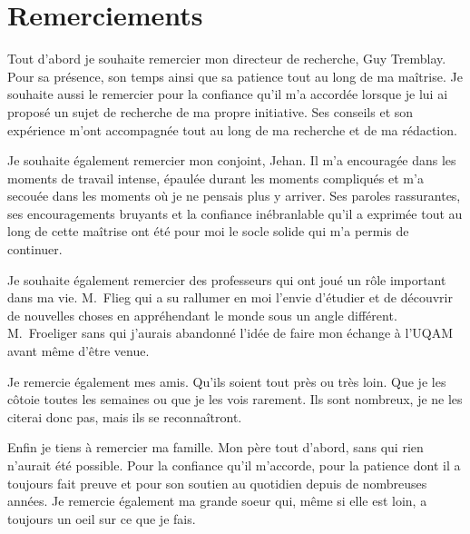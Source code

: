 \chapter*{Remerciements}


Tout d'abord je souhaite remercier mon directeur de recherche, Guy Tremblay.
Pour sa présence, son temps ainsi que sa patience tout au long de ma maîtrise.
Je souhaite aussi le remercier pour la confiance qu'il m'a accordée lorsque je lui ai proposé un sujet de recherche de ma propre initiative.
Ses conseils et son expérience m'ont accompagnée tout au long de ma recherche et de ma rédaction.


Je souhaite également remercier mon conjoint, Jehan.
Il m'a encouragée dans les moments de travail intense, épaulée durant les moments compliqués et m'a secouée dans les moments où je ne pensais plus y arriver. 
Ses paroles rassurantes, ses encouragements bruyants et la confiance inébranlable qu'il a exprimée tout au long de cette maîtrise ont été pour moi le socle solide qui m'a permis de continuer.


Je souhaite également remercier des professeurs qui ont joué un rôle important dans ma vie.
M.~Flieg qui a su rallumer en moi l'envie d'étudier et de découvrir de nouvelles choses en appréhendant le monde sous un angle différent.
M.~Froeliger sans qui j'aurais abandonné l'idée de faire mon échange à l'UQAM avant même d'être venue.


Je remercie également mes amis.
Qu'ils soient tout près ou très loin.
Que je les côtoie toutes les semaines ou que je les vois rarement.
Ils sont nombreux, je ne les citerai donc pas, mais ils se reconnaîtront.


Enfin je tiens à remercier ma famille.
Mon père tout d'abord, sans qui rien n'aurait été possible.
Pour la confiance qu'il m'accorde, pour la patience dont il a toujours fait preuve et pour son soutien au quotidien depuis de nombreuses années.
Je remercie également ma grande soeur qui, même si elle est loin, a toujours un oeil sur ce que je fais.
